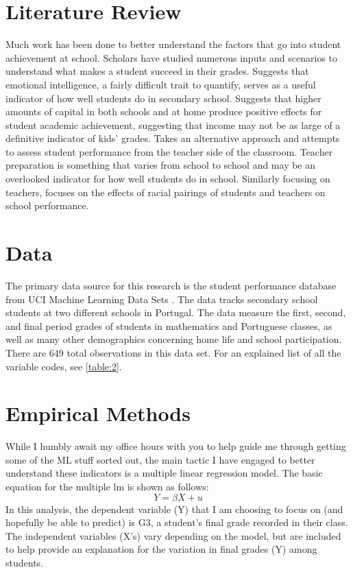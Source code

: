 \documentclass[12pt,english]{article}
\begin{document}
\pagebreak{}

\section{Literature Review}\label{sec:litreview}
Much work has been done to better understand the factors that go into student achievement at school. Scholars have studied numerous inputs and scenarios to understand what makes a student succeed in their grades. \citet{emotional} Suggests that emotional intelligence, a fairly difficult trait to quantify, serves as a useful indicator of how well students do in secondary school. \citet{capital} Suggests that higher amounts of capital in both schools and at home produce positive effects for student academic achievement, suggesting that income may not be as large of a definitive indicator of kids' grades. \citet{preparation} Takes an alternative approach and attempts to assess student performance from the teacher side of the classroom. Teacher preparation is something that varies from school to school and may be an overlooked indicator for how well students do in school. Similarly focusing on teachers, \citet{race} focuses on the effects of racial pairings of students and teachers on school performance.  
\pagebreak{}

\section{Data}\label{sec:data}
The primary data source for this research is the student performance database from UCI Machine Learning Data Sets \citet{cortez_silva_2008}. The data tracks secondary school students at two different schools in Portugal. The data measure the first, second, and final period grades of students in mathematics and Portuguese classes, as well as many other demographics concerning home life and school participation. There are 649 total observations in this data set. For an explained list of all the variable codes, see \ref{table:2}.
\pagebreak{}

\section{Empirical Methods}\label{sec:methods}
While I humbly await my office hours with you to help guide me through getting some of the ML stuff sorted out, the main tactic I have engaged to better understand these indicators is a multiple linear regression model. The basic equation for the multiple lm is shown as follows: 
\begin{equation}
        Y = \beta{X} + u
\end{equation} In this analysis, the dependent variable (Y) that I am choosing to focus on (and hopefully be able to predict) is G3, a student's final grade recorded in their class. The independent variables (X's) vary depending on the model, but are included to help provide an explanation for the variation in final grades (Y) among students.
\end{document}
